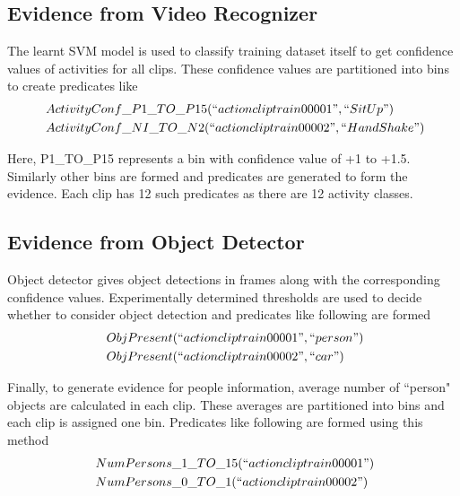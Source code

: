 \subsection{Evidence from Video Recognizer}
The learnt SVM model is used to classify training dataset itself to get
confidence values of activities for all clips. These confidence values
are partitioned into bins to create predicates like
\begin{equation}
	\begin{split}
		~ & ActivityConf\_P1\_TO\_P15(``actioncliptrain00001",``SitUp") \\
		~ & ActivityConf\_NI\_TO\_N2(``actioncliptrain00002",``HandShake")
	\end{split}
\end{equation}

Here, P1\_TO\_P15 represents a bin with confidence value of +1 to +1.5.
Similarly other bins are formed and predicates are generated to form the evidence.
Each clip has 12 such predicates as there are 12 activity classes.

\subsection{Evidence from Object Detector}
Object detector \cite{voc-release4} gives object detections in frames
along with the corresponding confidence values. Experimentally determined thresholds
are used to decide whether to consider object detection and predicates like following are formed
\begin{equation}
	\begin{split}
		~ & ObjPresent(``actioncliptrain00001",``person") \\
		~ & ObjPresent(``actioncliptrain00002",``car")
	\end{split}
\end{equation}

Finally, to generate evidence for people information, average number of ``person"
objects are calculated in each clip. These averages are partitioned into bins
and each clip is assigned one bin. Predicates like following are formed using this method
\begin{equation}
	\begin{split}
		~ & NumPersons\_1\_TO\_15(``actioncliptrain00001") \\
		~ & NumPersons\_0\_TO\_1(``actioncliptrain00002")
	\end{split}
\end{equation}

